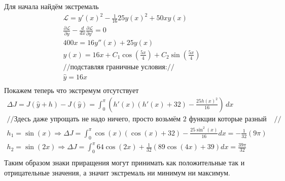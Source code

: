 \documentclass{article}
\newcommand{\Lagr}{\mathcal{L}}
\begin{document}
Для начала найдём экстремаль
\begin{gather*}
    \Lagr =y'(x)^2-\frac{1}{16} 25 y(x)^2+50 x y(x)\\
    \frac{\partial \Lagr}{\partial y}  - \frac{d }{d x} \frac{\partial \Lagr}{\partial y'} =0   \\
    400 x=16 y''(x)+25 y(x)\\
    y(x) = 16 x+C_1 \cos \left(\frac{5 x}{4}\right)+C_2 \sin \left(\frac{5 x}{4}\right)\\
    //\text{подставляя граничные условия:}//\\
    \hat y=16 x\\
\end{gather*}
Покажем теперь что экстремум отсутствует
\begin{gather*}
    \Delta J = J(\hat y + h) - J(\hat y) = \int_0^{\pi } \left(h'(x) \left(h'(x)+32\right)-\frac{25 h(x)^2}{16}\right) \, dx\\
    //\text{Здесь даже упрощать не надо ничего, просто возьмём 2 функции которые разный знак дадут}//\\
    h_1=\sin{(x)} \Rightarrow  \Delta J = \int_0^\pi \cos (x) (\cos (x)+32)-\frac{25 \sin ^2(x)}{16} dx = -\frac{1}{32} (9 \pi )\\
    h_2 = \sin{(2x)} \Rightarrow  \Delta J = \int_0^\pi 64 \cos (2 x)+\frac{1}{32} (89 \cos (4 x)+39) dx = \frac{39 \pi }{32}\\
\end{gather*}
Таким образом знаки приращения могут принимать как положительные так и отрицательные значения, а значит экстремаль ни минимум ни максимум.
\end{document}
